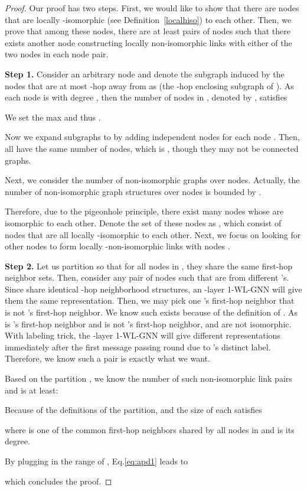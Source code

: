 \documentclass{article}
\begin{document}
\begin{proof}
Our proof has two steps. First, we would like to show that there are  nodes that are locally -isomorphic (see Definition~\ref{localhiso}) to each other. Then, we prove that among these nodes, there are at least  pairs of nodes such that there exists another node constructing locally  non-isomorphic links with either of the two nodes in each node pair. 

\textbf{Step 1.} Consider an arbitrary node  and denote the subgraph induced by the nodes that are at most -hop away from  as  (the -hop enclosing subgraph of ). As each node is with degree , then the number of nodes in , denoted by , satisfies 

We set the max  and thus . 

Now we expand subgraphs  to  by adding  independent nodes for each node . Then, all  have the same number of nodes, which is , though they may not be connected graphs. 

Next, we consider the number of non-isomorphic graphs over  nodes. Actually, the number of non-isomorphic graph structures over  nodes is bounded by .

Therefore, due to the pigeonhole principle, there exist  many nodes  whose  are isomorphic to each other. Denote the set of these nodes as , which consist of nodes that are all locally -isomorphic to each other. Next, we focus on looking for other nodes to form locally -non-isomorphic links with nodes . 

\textbf{Step 2.} Let us partition  so that for all nodes in , they share the same first-hop neighbor sets. Then, consider any pair of nodes  such that  are from different 's. Since  share identical -hop neighborhood structures, an -layer 1-WL-GNN will give them the same representation. Then, we may pick one 's first-hop neighbor  that is not 's first-hop neighbor. We know such  exists because of the definition of . As  is 's first-hop neighbor and is not 's first-hop neighbor,  and  are not isomorphic. With labeling trick, the -layer 1-WL-GNN will give  different representations immediately after the first message passing round due to 's distinct label. Therefore, we know such a  pair is exactly what we want.

Based on the partition , we know the number of such non-isomorphic link pairs  and  is at least:


Because of the definitions of the partition,   and the size of each  satisfies

where  is one of the common first-hop neighbors shared by all nodes in  and  is its degree.

By plugging in the range of , Eq.\ref{eq:apd1} leads to 

which concludes the proof. 

\end{proof}
\end{document}
